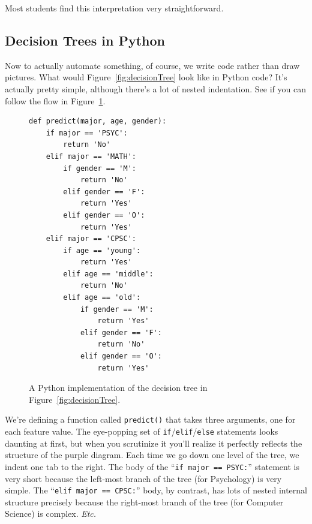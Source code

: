 Most students find this interpretation very straightforward.

\subsection{Decision Trees in Python}


Now to actually automate something, of course, we write code rather than draw
pictures. What would Figure~\ref{fig:decisionTree} look like in Python code?
It's actually pretty simple, although there's a lot of nested indentation. See
if you can follow the flow in Figure~\ref{fig:pythonDT}.

\begin{figure}[h]
\centering
\begin{Verbatim}[fontsize=\footnotesize,samepage=true,frame=single,framesep=3mm,xleftmargin=2cm,xrightmargin=2cm]
def predict(major, age, gender):
    if major == 'PSYC':
        return 'No'
    elif major == 'MATH':
        if gender == 'M':
            return 'No'
        elif gender == 'F':
            return 'Yes'
        elif gender == 'O':
            return 'Yes'
    elif major == 'CPSC':
        if age == 'young':
            return 'Yes'
        elif age == 'middle':
            return 'No'
        elif age == 'old':
            if gender == 'M':
                return 'Yes'
            elif gender == 'F':
                return 'No'
            elif gender == 'O':
                return 'Yes'
\end{Verbatim}
\caption{A Python implementation of the decision tree in
Figure~\ref{fig:decisionTree}.}
\label{fig:pythonDT}
\end{figure}


We're defining a function called \texttt{predict()} that takes three arguments,
one for each feature value. The eye-popping set of
\texttt{if}/\texttt{elif}/\texttt{else} statements looks daunting at first, but
when you scrutinize it you'll realize it perfectly reflects the structure of
the purple diagram. Each time we go down one level of the tree, we indent one
tab to the right. The body of the ``\texttt{if major == \textquotesingle
PSYC\textquotesingle :}'' statement is
very short because the left-most branch of the tree (for Psychology) is very
simple. The ``\texttt{elif major == \textquotesingle CPSC\textquotesingle :}'' body, by contrast, has lots of
nested internal structure precisely because the right-most branch of the tree
(for Computer Science) is complex. \textit{Etc.}

